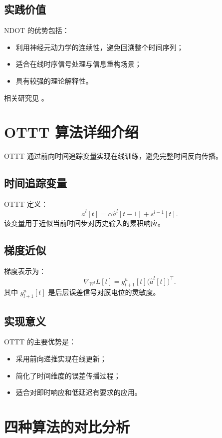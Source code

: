 \documentclass[journal,12pt,onecolumn]{IEEEtran}
\begin{document}
\subsection{实践价值}
NDOT 的优势包括：
\begin{itemize}
  \item 利用神经元动力学的连续性，避免回溯整个时间序列；
  \item 适合在线时序信号处理与信息重构场景；
  \item 具有较强的理论解释性。
\end{itemize}

相关研究见 \cite{jiang2024ndot}。

\section{OTTT 算法详细介绍}
OTTT 通过前向时间追踪变量实现在线训练，避免完整时间反向传播。

\subsection{时间追踪变量}
OTTT 定义：
\begin{equation}
  \hat{a}^l[t] = \alpha \hat{a}^l[t-1] + s^{l-1}[t].
\end{equation}
该变量用于近似当前时间步对历史输入的累积响应。

\subsection{梯度近似}
梯度表示为：
\begin{equation}
  \nabla_{W^l} L[t] = g^u_{l+1}[t] \bigl(\hat{a}^l[t]\bigr)^\top.
\end{equation}
其中 $g^u_{l+1}[t]$ 是后层误差信号对膜电位的灵敏度。

\subsection{实现意义}
OTTT 的主要优势是：
\begin{itemize}
  \item 采用前向递推实现在线更新；
  \item 简化了时间维度的误差传播过程；
  \item 适合对即时响应和低延迟有要求的应用。
\end{itemize}

\section{四种算法的对比分析}
\end{document}
